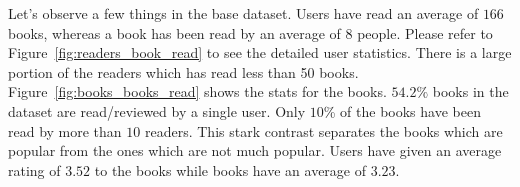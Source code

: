 \documentclass[11pt]{article}
\begin{document}
Let's observe a few things in the base dataset. Users have read an average of $166$ books, whereas a book has been read by an average of $8$ people. Please refer to Figure~\ref{fig:readers_book_read} to see the detailed user statistics. There is a large portion of the readers which has read less than 50 books. Figure~\ref{fig:books_books_read} shows the stats for the books. $54.2\%$ books in the dataset are read/reviewed by a single user. Only $10$\% of the books have been read by more than $10$ readers. This stark contrast separates the books which are popular from the ones which are not much popular. Users have given an average rating of $3.52$ to the books while books have an average of $3.23$.


\end{document}
